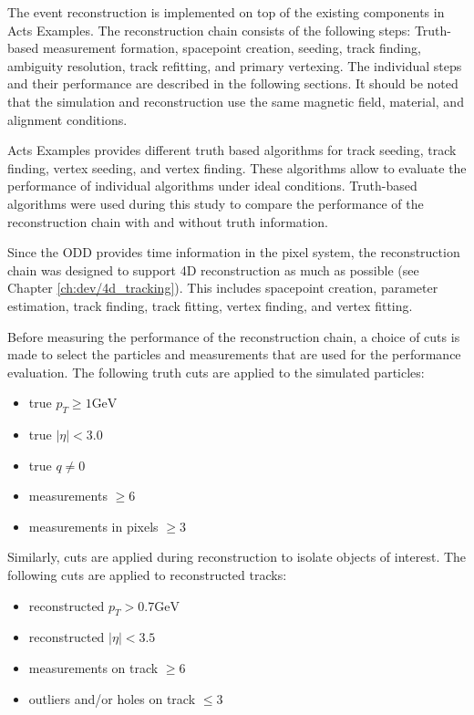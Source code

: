 The event reconstruction is implemented on top of the existing components in Acts Examples. The reconstruction chain consists of the following steps: Truth-based measurement formation, spacepoint creation, seeding, track finding, ambiguity resolution, track refitting, and primary vertexing. The individual steps and their performance are described in the following sections. It should be noted that the simulation and reconstruction use the same magnetic field, material, and alignment conditions.

Acts Examples provides different truth based algorithms for track seeding, track finding, vertex seeding, and vertex finding. These algorithms allow to evaluate the performance of individual algorithms under ideal conditions. Truth-based algorithms were used during this study to compare the performance of the reconstruction chain with and without truth information.

Since the ODD provides time information in the pixel system, the reconstruction chain was designed to support 4D reconstruction as much as possible (see Chapter \ref{ch:dev/4d_tracking}). This includes spacepoint creation, parameter estimation, track finding, track fitting, vertex finding, and vertex fitting.

Before measuring the performance of the reconstruction chain, a choice of cuts is made to select the particles and measurements that are used for the performance evaluation. The following truth cuts are applied to the simulated particles:

\begin{itemize}
    \item true $p_T \ge 1 \text{GeV}$
    \item true $|\eta| < 3.0$
    \item true $q \ne 0$
    \item measurements $\ge 6$
    \item measurements in pixels $\ge 3$
\end{itemize}

Similarly, cuts are applied during reconstruction to isolate objects of interest. The following cuts are applied to reconstructed tracks:

\begin{itemize}
    \item reconstructed $p_T > 0.7 \text{GeV}$
    \item reconstructed $|\eta| < 3.5$
    \item measurements on track $\ge 6$
    \item outliers and/or holes on track $\le 3$
\end{itemize}

